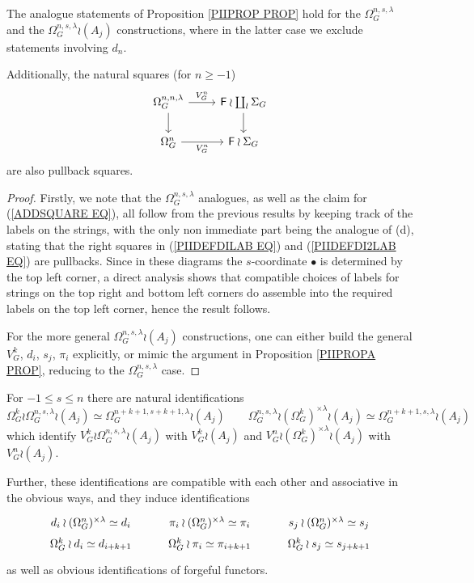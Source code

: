 \documentclass[a4paper,10pt]{article}%
\begin{document}
\begin{proposition}
The analogue statements of Proposition \ref{PIIPROP PROP}
hold for the 
$\Omega_{G}^{n,s,\lambda}$
and the 
$\Omega_{G}^{n,s,\lambda} \wr (A_j)$
constructions, where in the latter case
we exclude statements involving $d_n$.

Additionally, the natural squares  (for $n \geq -1$)
\begin{equation}\label{ADDSQUARE EQ}
\begin{tikzcd}
	\Omega_{G}^{n,n,\lambda}
	\ar{r}{V_{G}^{n}} \ar{d}& 
	\Fin \wr \coprod_l \Sigma_G \ar{d}
\\
	\Omega_{G}^{n} \ar{r}[swap]{V_{G}^{n}} &
	\Fin \wr \Sigma_G
\end{tikzcd}
\end{equation}
are also pullback squares.
\end{proposition}

\begin{proof}
	Firstly, we note that the $\Omega_{G}^{n,s,\lambda}$
	analogues, as well as the claim for (\ref{ADDSQUARE EQ}), all follow from the previous results
	by keeping track of the labels on the strings, 
	with the only non immediate part
	being the analogue of (d), stating that the right squares in 
	(\ref{PIIDEFDILAB EQ}) and
	(\ref{PIIDEFDI2LAB EQ}) are pullbacks. Since in these diagrams the $s$-coordinate $\bullet$ is determined by the top left corner, a direct analysis shows that compatible choices of labels for strings on the top right and bottom left corners do assemble into the required labels on the top left corner, hence the result follows.
		
	For the more general $\Omega_{G}^{n,s,\lambda} \wr (A_j)$ constructions, one can either build the
	general $V_G^k$, $d_i$, $s_j$, $\pi_i$ 
	explicitly, or mimic the argument in Proposition \ref{PIIPROPA PROP}, reducing to the 
	$\Omega_{G}^{n,s,\lambda}$ case.
\end{proof}

\begin{corollary}\label{LABIDEN COR}
For $-1 \leq s \leq n$ there are natural identifications
\[
	\Omega_G^{k} \wr \Omega_G^{n,s,\lambda} \wr (A_j) \simeq
	\Omega_G^{n+k+1,s+k+1,\lambda} \wr (A_j)
\qquad
	\Omega_G^{n,s,\lambda} \wr 
	(\Omega_G^k)^{\times \lambda}
	\wr (A_j)
\simeq
	\Omega_G^{n+k+1,s,\lambda} \wr (A_j)
\]
which identify 
$V^k_G \wr \Omega_G^{n,s,\lambda} \wr (A_j) $ with 
$V^k_G \wr (A_j) $
and 
$V_G^n \wr (\Omega_G^k)^{\times \lambda}\wr (A_j) $
with 
$V_G^n \wr (A_j)$.

Further, these identifications are compatible with each other and associative in the obvious ways, and they induce identifications
\[
\begin{tikzcd}[row sep =0]
	d_i \wr (\Omega_G^{n})^{\times \lambda} \simeq d_i 
&
	\pi_i \wr (\Omega_G^{n})^{\times \lambda} \simeq \pi_i 
&
	s_j \wr (\Omega_G^{n})^{\times \lambda} \simeq s_j 
\\
	\Omega_G^k \wr d_i \simeq d_{i+k+1} 
&
	\Omega_G^k \wr \pi_i \simeq \pi_{i+k+1} 
&
	\Omega_G^k \wr s_j \simeq s_{j+k+1}
\end{tikzcd}
\]
as well as obvious identifications of forgeful functors.
\end{corollary}
\end{document}
